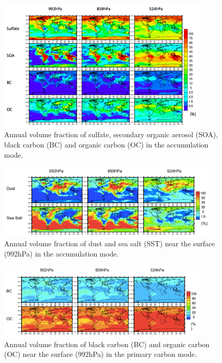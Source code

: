 \documentclass[12pt, fullpage]{uiucthesis2009}
\begin{document}
		\begin{figure}[h] 
			\begin{center}
				\includegraphics[width = 0.9\textwidth]{Figure29}
				\caption[Annual average of the volume fraction of sulfate, secondary organic aerosol (SOA), black carbon (BC) and organic carbon (OC) in the accumulation mode]{\label{fig_P29} Annual volume fraction of sulfate, secondary organic aerosol (SOA), black carbon (BC) and organic carbon (OC) in the accumulation mode.}
			\end{center}
		\end{figure}
			\begin{figure}[h] 
				\begin{center}
					\includegraphics[width = 0.95\textwidth]{Figure30}
					\caption[Annual volume fraction of dust and sea salt (SST) near the surface (992hPa) in the accumulation mode]{\label{fig_P30} Annual volume fraction of dust and sea salt (SST) near the surface (992hPa) in the accumulation mode.}
				\end{center}
			\end{figure}
				\begin{figure}[h] 
					\begin{center}
						\includegraphics[width = 0.9\textwidth]{Figure31}
						\caption[Annual volume fraction of black carbon (BC) and organic carbon (OC) near the surface (992hPa) in the primary carbon mode]{\label{fig_P31} Annual volume fraction of black carbon (BC) and organic carbon (OC) near the surface (992hPa) in the primary carbon mode.}
					\end{center}
				\end{figure}
\end{document}
